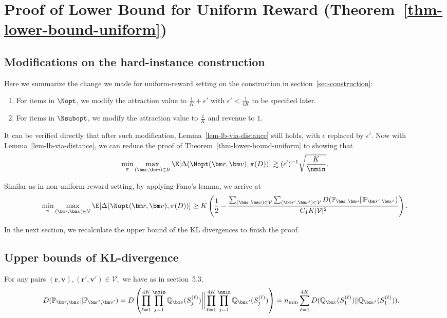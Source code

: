 \documentclass[10pt, letterpaper]{article}
\begin{document}
\section{Proof of Lower Bound for Uniform Reward (Theorem~\ref{thm-lower-bound-uniform})}\label{appendix-proof-lower-bound-uniform}


\subsection{Modifications on the hard-instance construction}

Here we summarize the change we made for uniform-reward setting on the construction in section~\ref{sec-construction}:
\begin{enumerate}
    \item For items in $\Nopt$, we modify the attraction value to $\frac{1}{K} +\epsilon' $ with $\epsilon' < \frac{1}{4K}$ to be specified later.
    \item For items in $\Nsubopt$, we modify the attraction value to $\frac{1}{K} $ and revenue to $1.$
\end{enumerate}


It can be verified directly that after such modification, Lemma~\ref{lem-lb-via-distance} still holds, with $\epsilon$ replaced by $\epsilon'.$ Now with Lemma~\ref{lem-lb-via-distance}, we can reduce the proof of Theorem~\ref{thm-lower-bound-uniform} to showing that \begin{equation}\label{eq-reduce-to-distance-lb-uniform}
        \min_{\pi}\max_{(\bm r, \bm v) \in \mathcal{V}} \E[ \Delta (\Nopt(\bm r, \bm v),\pi (D))] \gtrsim  (\epsilon')^{-1}\sqrt{\frac{K}{\nmin}}.
\end{equation}

Similar as in non-uniform reward setting, by applying Fano's lemma, we arrive at \begin{align*}
       \min_{\pi}\max_{(\bm r, \bm v) \in \mathcal{V}} \E[ \Delta (\Nopt(\bm r, \bm v),\pi (D))] \geq  K\left(\frac{1}{2} - \frac{\sum_{(\bm r, \bm v)\in \mathcal{V}}\sum_{(\bm r', \bm v')\in \mathcal{V}} D(\mathbb{P}_{\bm r, \bm v} \lVert \mathbb{P}_{\bm r', \bm v'}) }{C_1 K\lvert \mathcal V \rvert^2} \right).
\end{align*}

In the next section, we recalculate the upper bound of the KL divergences to finish the proof.

\subsection{Upper bounds of KL-divergence}
For any pairs $(\bm r, \bm v),(\bm r', \bm v') \in \mathcal{V},$ we have as in section~5.3,
\begin{align*}
    D(\mathbb{P}_{\bm r, \bm v} \lVert \mathbb{P}_{\bm r', \bm v'}) &= D\left( \prod_{\ell=1}^{4K}\prod_{j = 1}^{\nmin} \mathbb{Q}_{\bm v}(S_{j}^{(\ell)}) \bigg\lVert \prod_{\ell=1}^{4K}\prod_{j = 1}^{\nmin} \mathbb{Q}_{\bm v'}(S_{j}^{(\ell)})  \right)= n_{\min}\sum_{\ell = 1}^{4K} D(\mathbb{Q}_{\bm v} (S^{(\ell)}_1) \rVert \mathbb{Q}_{\bm v'} (S^{(\ell)}_1)).
\end{align*}
\end{document}
